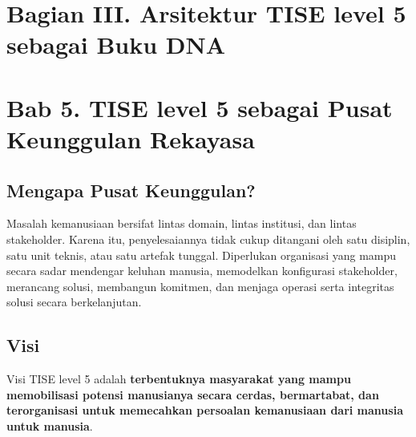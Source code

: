 \documentclass[
  letterpaper,
  DIV=11,
  numbers=noendperiod]{scrreprt}
\begin{document}

\chapter*{Bagian III. Arsitektur TISE level 5 sebagai Buku
DNA}\label{bagian-iii.-arsitektur-tise-level-5-sebagai-buku-dna}



\chapter*{Bab 5. TISE level 5 sebagai Pusat Keunggulan
Rekayasa}\label{bab-5.-tise-level-5-sebagai-pusat-keunggulan-rekayasa}


\section*{Mengapa Pusat Keunggulan?}\label{mengapa-pusat-keunggulan}


Masalah kemanusiaan bersifat lintas domain, lintas institusi, dan lintas
stakeholder. Karena itu, penyelesaiannya tidak cukup ditangani oleh satu
disiplin, satu unit teknis, atau satu artefak tunggal. Diperlukan
organisasi yang mampu secara sadar mendengar keluhan manusia, memodelkan
konfigurasi stakeholder, merancang solusi, membangun komitmen, dan
menjaga operasi serta integritas solusi secara berkelanjutan.

\section*{Visi}\label{visi}


Visi TISE level 5 adalah \textbf{terbentuknya masyarakat yang mampu
memobilisasi potensi manusianya secara cerdas, bermartabat, dan
terorganisasi untuk memecahkan persoalan kemanusiaan dari manusia untuk
manusia}.
\end{document}
